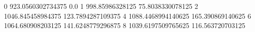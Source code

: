 0 923.0560302734375 0.0
1 998.85986328125 75.8038330078125
2 1046.845458984375 123.7894287109375
4 1088.4468994140625 165.390869140625
6 1064.680908203125 141.6248779296875
8 1039.6197509765625 116.563720703125
